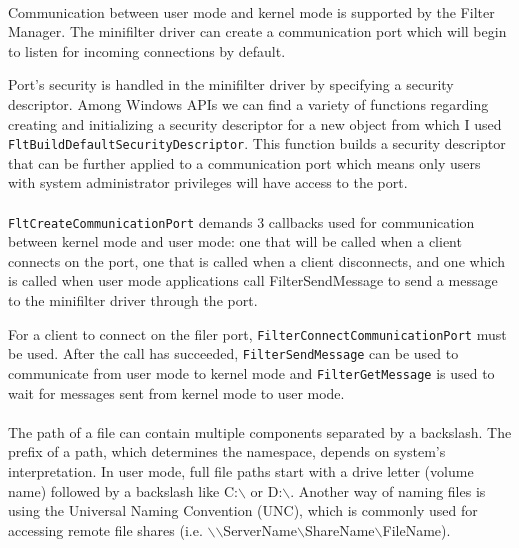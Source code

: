 		\paragraph{}
		Communication between user mode and kernel mode is supported by the Filter Manager. The minifilter driver can create a communication port which will begin to listen for incoming connections by default. 
		
		Port's security is handled in the minifilter driver by specifying a security descriptor. Among  Windows APIs we can find a variety of functions regarding creating and initializing a security descriptor for a new object from which I used \texttt{FltBuildDefaultSecurityDescriptor}. This function builds a security descriptor that can be further applied to a communication port which means only users with system administrator privileges will have access to the port\cite{MSDNCommunication}.
		
		\paragraph{}
		\texttt{FltCreateCommunicationPort} demands 3 callbacks used for communication between kernel mode and user mode: one that will be called when a client connects on the port, one that is called when a client disconnects, and one which is called when user mode applications call FilterSendMessage to send a message to the minifilter driver through the port\cite{MSDNCommunication}.
		

		For a client to connect on the filer port, \texttt{FilterConnectCommunicationPort} must be used. After the call has succeeded, \texttt{FilterSendMessage} can be used to communicate from user mode to kernel mode and \texttt{FilterGetMessage} is used to wait for messages sent from kernel mode to user mode\cite{MSDNCommunication}.
		
		
		\paragraph{}
		The path of a file can contain multiple components separated by a backslash. The prefix of a path, which determines the namespace, depends on system's interpretation. In user mode, full file paths start with a drive letter (volume name) followed by a backslash like C:$\backslash$ or D:$\backslash$. Another way of naming files is using the Universal Naming Convention (UNC), which is commonly used for accessing remote file shares (i.e. $\backslash$$\backslash$ServerName$\backslash$ShareName$\backslash$FileName).
		
